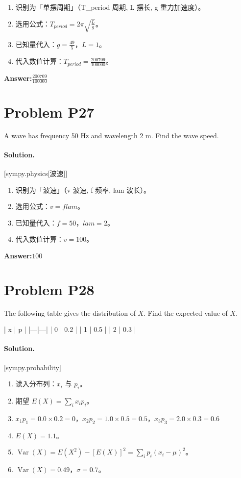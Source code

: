 \documentclass[11pt,a4paper]{ctexart}
\newcommand{\solvertag}[1]{{\footnotesize\color{gray}\textsf{[#1]}}}
\begin{document}
\begin{enumerate}[leftmargin=*]
  \item 识别为「单摆周期」（T\_period 周期, L 摆长, g 重力加速度）。
  \item 选用公式：$T_{period} = 2 \pi \sqrt{\frac{L}{g}}$。
  \item 已知量代入：$g = \frac{49}{5}$，$L = 1$。
  \item 代入数值计算：$ T_{period} = \frac{200709}{100000} $。
\end{enumerate}

\noindent\textbf{Answer:}\quad $\frac{200709}{100000}$

\medskip

\section*{Problem P27}
A wave has frequency 50 Hz and wavelength 2 m. Find the wave speed.

\paragraph{Solution.} \solvertag{sympy.physics[波速]} 

\begin{enumerate}[leftmargin=*]
  \item 识别为「波速」（v 波速, f 频率, lam 波长）。
  \item 选用公式：$v = f lam$。
  \item 已知量代入：$f = 50$，$lam = 2$。
  \item 代入数值计算：$ v = 100 $。
\end{enumerate}

\noindent\textbf{Answer:}\quad $100$

\medskip

\section*{Problem P28}
The following table gives the distribution of $X$. Find the expected value of $X$.

| x | p |
|---|---|
| 0 | 0.2 |
| 1 | 0.5 |
| 2 | 0.3 |

\paragraph{Solution.} \solvertag{sympy.probability} 

\begin{enumerate}[leftmargin=*]
  \item 读入分布列：$x_i$ 与 $p_i$。
  \item 期望 $E(X) = \sum_i x_i p_i$。
  \item $x_{1}p_{1} = 0.0 \times 0.2 = 0$，$x_{2}p_{2} = 1.0 \times 0.5 = 0.5$，$x_{3}p_{3} = 2.0 \times 0.3 = 0.6$
  \item $E(X) = 1.1$。
  \item $\operatorname{Var}(X) = E(X^2) - [E(X)]^2 = \sum_i p_i(x_i - \mu)^2$。
  \item $\operatorname{Var}(X) = 0.49$，$\sigma = 0.7$。
\end{enumerate}
\end{document}
